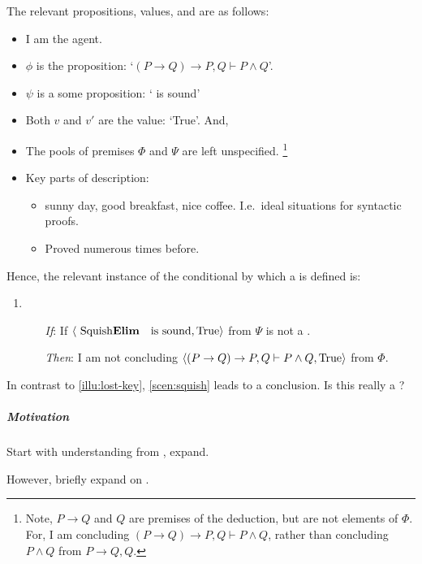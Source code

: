 \begin{note}
  The relevant propositions, values, and  are as follows:
  \begin{itemize}[noitemsep]
  \item
    I am the agent.
  \item
    \(\phi\) is the proposition: `\((P \rightarrow Q) \rightarrow P, Q \vdash P \land Q\)'.
  \item
    \(\psi\) is a some proposition: `\sqE{} is sound'
  \item
    Both \(v\) and \(v'\) are the value: `True'.
    And,
  \item
    The pools of premises \(\Phi\) and \(\Psi\) are left unspecified.%
    \footnote{
      Note, \(P \rightarrow Q\) and \(Q\) are premises of the deduction, but are not elements of \(\Phi\).
      For, I am concluding \((P \rightarrow Q) \rightarrow P, Q \vdash P \land Q\), rather than concluding \(P \land Q\) from \(P \rightarrow Q,Q\).
    }
  \item
    Key parts of description:
    \begin{itemize}[noitemsep]
    \item
      sunny day, good breakfast, nice coffee.
      I.e.\ ideal situations for syntactic proofs.
    \item
      Proved \sqE{} numerous times before.
    \end{itemize}
  \end{itemize}

  Hence, the relevant instance of the conditional by which a \requ{} is defined is:

  \begin{enumerate}[label=]
  \item
    \begin{itemize}
    \item[\emph{If}:]
      If \(\pv{\text{\sqE{} is sound}}{\text{True}}\) from \(\Psi\) is not a \fc{}.
    \item[\emph{Then}:]
      I am not concluding \(\langle (P \rightarrow Q) \rightarrow P, Q \vdash P \land Q, \text{True} \rangle\) from \(\Phi\).
    \end{itemize}
  \end{enumerate}

  In contrast to \autoref{illu:lost-key}, \autoref{scen:squish} leads to a conclusion.
  Is this really a \requ{}?
\end{note}

\subparagraph{Motivation}

\begin{note}
  Start with understanding from , expand.

  However, briefly expand on \sqE{}.
\end{note}

